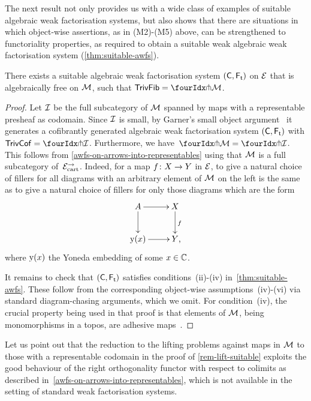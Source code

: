 \documentclass[reqno,10pt,a4paper,oneside,draft]{amsart}
\begin{document}
{{The next result not only provides us with a wide class of examples of suitable algebraic weak factorisation systems, but also shows that there are situations in which object-wise assertions,
as in (M2)-(M5) above, can be strengthened to functoriality properties, as required to obtain a suitable weak algebraic weak factorisation system (\cref{thm:suitable-awfs}). 

\begin{proposition}  \label{rem-lift-suitable} 
There exists a suitable algebraic weak factorisation system $(\CC, \TF)$ on $\cal{E}$ that is algebraically free on $\cal{M}$, \ie such that $\TrivFib = \liftr{\cal{M}}$.
\end{proposition}

\begin{proof}
Let $\cal{I}$ be the full subcategory of $\cal{M}$ spanned by maps with a representable presheaf as codomain. 
Since $\cal{I}$ is small, by Garner's small object argument~\cite{garner:small-object-argument} it generates a
cofibrantly generated algebraic weak factorisation system $(\CC, \TF)$ with $\TrivCof =  \liftr{\cal{I}}$. Furthermore, we have~$\liftr{\cal{M}} = \liftr{\cal{I}}$.
This follows from \cref{awfs-on-arrows-into-representables} using that $\cal{M}$ is a full subcategory of~$\cal{E}^\to_\cart$. Indeed, for a map $f \co X \to Y$ in $\catE$, to give a natural choice of fillers for all diagrams with an arbitrary element of $\cal{M}$ on the left is the same as to give a natural choice of fillers for only those diagrams which are the form
\[
\xymatrix{
  A
  \ar[r]
  \ar[d]
&
  X
  \ar[d]^f
\\
  \yon(x)
  \ar[r]
&
  Y
\rlap{,}}
\]
where $\yon(x)$ the Yoneda embedding of some $x \in \catC$.

It remains to check that $(\CC, \TF)$ satisfies conditions~(ii)-(iv) in~\cref{thm:suitable-awfs}.
These follow from the corresponding object-wise assumptions~(iv)-(vi) via standard diagram-chasing arguments, which we omit.
For condition~(iv), the crucial property being used in that proof is that elements of $\cal{M}$, being monomorphisms in a topos, are adhesive maps~\cite{garner-lack:adhesive}. 
\end{proof}


Let us point out that the  reduction to the lifting problems against maps in $\cal{M}$ to those with a representable codomain in the proof of \cref{rem-lift-suitable} exploits the good behaviour of the right orthogonality functor with respect to colimits as described in~\cref{awfs-on-arrows-into-representables}, which is not available in the setting of standard weak factorisation systems. 



}}
\end{document}
